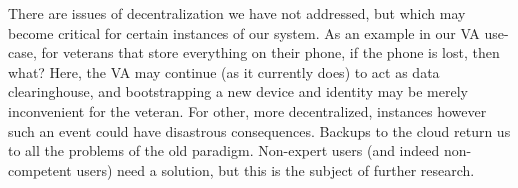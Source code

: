 There are issues of decentralization we have not addressed, but which may become critical for certain instances of our system.
As an example in our VA use-case, for veterans that store everything on their phone, if the phone is lost, then what?
Here, the VA may continue (as it currently does) to act as data clearinghouse, and bootstrapping a new device and identity may be merely inconvenient for the veteran.
For other, more decentralized, instances however such an event could have disastrous consequences.
Backups to the cloud return us to all the problems of the old paradigm.
Non-expert users (and indeed non-competent users) need a solution, but this is the subject of further research.